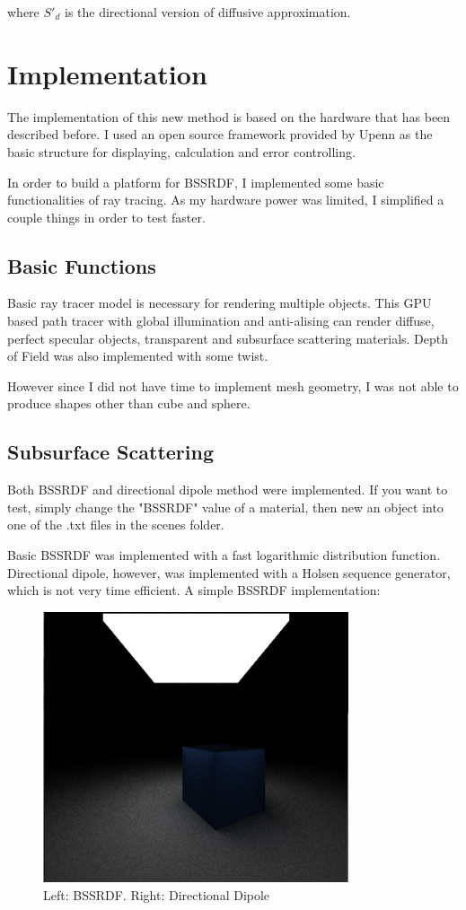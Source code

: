 \documentclass[11pt]{article}
\begin{document}
where $S'_d$ is the directional version of diffusive approximation.


\section{Implementation}
\label{sec:orgheadline7}
The implementation of this new method is based on the hardware that has been described before. 
I used an open source  framework provided by Upenn as the basic structure for displaying, calculation 
and error controlling. 

In order to build a platform for BSSRDF, I implemented some basic functionalities of ray tracing. As my hardware power was limited, 
I simplified a couple things in order to test faster. 
\subsection{Basic Functions}
\label{sec:orgheadline5}
Basic ray tracer model is necessary for rendering multiple objects. This GPU based path tracer with global illumination and anti-alising 
can render diffuse, perfect specular objects, transparent and subsurface scattering materials. Depth of Field was also implemented 
with some twist.

However since I did not have time to implement mesh geometry, I was not able to produce shapes other than cube and sphere.  
\subsection{Subsurface Scattering}
\label{sec:orgheadline6}
Both BSSRDF and directional dipole method were implemented. If you want to test, simply change the "BSSRDF" value of a material, then new an object into 
one of the .txt files in the scenes folder. 

Basic BSSRDF was implemented with a fast logarithmic distribution function. Directional dipole, however, was implemented with a 
Holsen sequence  generator, which is not very time efficient. A simple BSSRDF implementation:

\begin{figure}[htb]
\centering
\includegraphics[width=9cm]{./img/bluesss.png}
\caption{\label{fig:orgparagraph1}
Left: BSSRDF. Right: Directional Dipole}
\end{figure}
\end{document}
